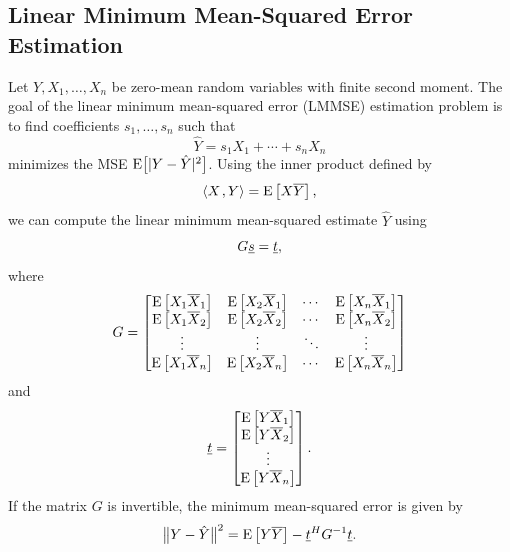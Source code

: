 \subsection{Linear Minimum Mean-Squared Error Estimation}

Let $Y,X_1,\ldots,X_n$ be zero-mean random variables with finite second moment.
The goal of the linear minimum mean-squared error (LMMSE) estimation problem is to find coefficients $s_1, \ldots, s_n$ such that
\[ \hat{Y} = s_1 X_1 + \cdots + s_n X_n \]
minimizes the MSE $\mathrm{E} \big[ |Y-\hat{Y}|^2 \big]$.
Using the inner product defined by
\begin{equation} \label{equation:ExpectationInnerProduct}
{\left\langle  X  \mskip2mu ,  Y  \right\rangle} = \mathrm{E} \left[ X \overline{Y} \right],
\end{equation}
we can compute the linear minimum mean-squared estimate $\hat{Y}$ using
\begin{equation*}
G \underline{s} = \underline{t},
\end{equation*}
where
\begin{equation*}
G = \begin{bmatrix}
\mathrm{E} \left[ X_1 \overline{X}_1 \right]
& \mathrm{E} \left[ X_2 \overline{X}_1 \right] & \cdots
& \mathrm{E} \left[ X_n \overline{X}_1 \right] \\
\mathrm{E} \left[ X_1 \overline{X}_2 \right]
& \mathrm{E} \left[ X_2 \overline{X}_2 \right] & \cdots
& \mathrm{E} \left[ X_n \overline{X}_2 \right] \\
\vdots & \vdots & \ddots & \vdots \\
\mathrm{E} \left[ X_1 \overline{X}_n \right]
& \mathrm{E} \left[ X_2 \overline{X}_n \right] & \cdots
& \mathrm{E} \left[ X_n \overline{X}_n \right] \\
\end{bmatrix}
\end{equation*}
and
\begin{equation*}
\underline{t} = \begin{bmatrix}
\mathrm{E} \left[ Y \overline{X}_1 \right] \\
\mathrm{E} \left[ Y \overline{X}_2 \right] \\ \vdots \\
\mathrm{E} \left[ Y \overline{X}_n \right] \end{bmatrix} .
\end{equation*}
If the matrix $G$ is invertible, the minimum mean-squared error is given by
\begin{equation*}
\big\| Y - \hat{Y} \big\|^2
= \mathrm{E} \left[ Y \overline{Y} \right]
- \underline{t}^H G^{-1} \underline{t} .
\end{equation*}



